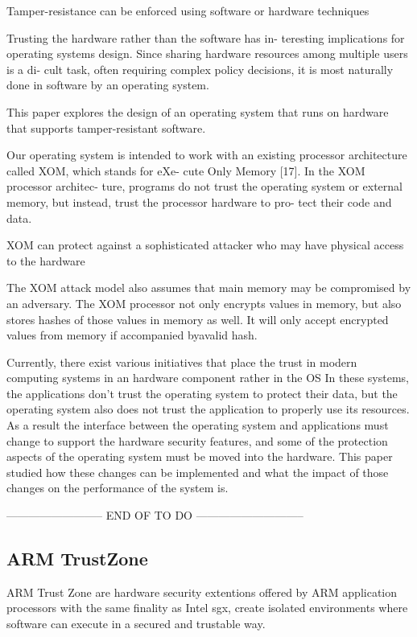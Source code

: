 Tamper-resistance can be enforced using software or hardware techniques

Trusting the hardware rather than the software has in-
teresting implications for operating systems design. Since
sharing hardware resources among multiple users is a di-
cult task, often requiring complex policy decisions, it is most
naturally done in software by an operating system.

This paper explores the design of an operating system that
runs on hardware that supports tamper-resistant software.

Our operating system is intended to work with an existing
processor architecture called XOM, which stands for eXe-
cute Only Memory [17]. In the XOM processor architec-
ture, programs do not trust the operating system or external
memory, but instead, trust the processor hardware to pro-
tect their code and data.

XOM can protect against a sophisticated attacker who may have physical access to the hardware

The XOM attack model also assumes that main memory may be compromised by an adversary. The XOM processor
not only encrypts values in memory, but also stores hashes of
those values in memory as well.
It will only accept encrypted values
from memory if accompanied byavalid hash.

Currently, there exist various initiatives that place the
trust in modern computing systems in an hardware component rather in the OS
In these systems,
the applications don't trust the operating system to protect
their data, but the operating system also does not trust the
application to properly use its resources.
As a result the interface between the operating system and applications must change to support the hardware security features, and some of the protection aspects of the operating system must
be moved into the hardware.
This paper studied how these
changes can be implemented and what the impact of those
changes on the performance of the system is.
 
-------------------------- END OF TO DO -----------------------------

\subsection{ARM TrustZone}
\label{ssec:armtz}

ARM Trust Zone \cite{armTZPaper} are hardware security extentions offered by ARM application processors with the same finality as Intel \gls{sgx}, create isolated environments where software can execute in a secured and trustable way. 

